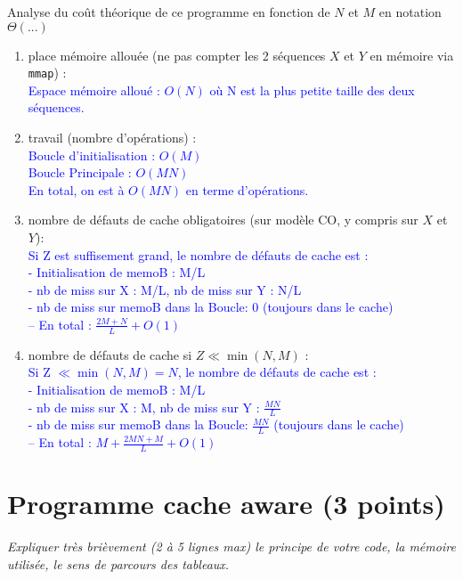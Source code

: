 \documentclass[10pt,a4paper]{article}
\begin{document}
Analyse du coût théorique de ce  programme en fonction de $N$ et $M$  en notation $\Theta(...)$ 
\begin{enumerate}
  \item place mémoire allouée (ne pas compter les 2 séquences $X$ et $Y$ en mémoire via {\tt mmap}) : \\
  \textcolor{blue}{
    Espace mémoire alloué : $O(N)$ où N est la plus petite taille des deux séquences.
  }
  \item travail (nombre d'opérations) : \\
  \textcolor{blue}{
    Boucle d'initialisation : $O(M)$ \\
    Boucle Principale       : $O(MN)$  \\
    En total, on est à $O(MN)$ en terme d'opérations.
  }
  \item nombre de défauts de cache obligatoires (sur modèle CO, y compris sur $X$ et $Y$): \\
  \textcolor{blue}{
    Si Z est suffisement grand, le nombre de défauts de cache est : \\
    - Initialisation de memoB : M/L \\
    - nb de miss sur X : M/L, nb de miss sur Y : N/L \\
    - nb de miss sur memoB dans la Boucle: 0 (toujours dans le cache) \\
    -- En total :  $\frac{2M + N}{L} + O(1)$
  }
  \item nombre de défauts de cache si $Z \ll \min(N,M)$ : \\
  \textcolor{blue}{
    Si Z $\ll \min(N,M) = N$, le nombre de défauts de cache est : \\
    - Initialisation de memoB : M/L \\
    - nb de miss sur X : M, nb de miss sur Y : $\frac{M N}{L}$ \\
    - nb de miss sur memoB dans la Boucle: $\frac{M N}{L}$ (toujours dans le cache) \\
    -- En total :  $M + \frac{2MN + M}{L} + O(1)$
  }
\end{enumerate}

\section{Programme cache aware  (3 points)}
{\em Expliquer très brièvement (2 à 5 lignes max) le principe de votre code, la mémoire utilisée, le sens de parcours des tableaux.}
\vspace*{1.0cm}
\end{document}
